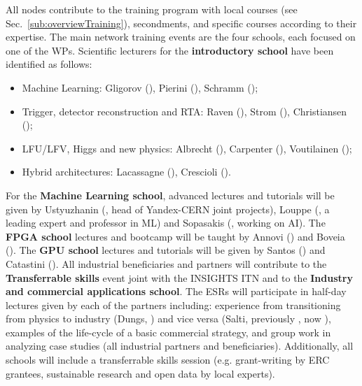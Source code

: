 All nodes contribute to the training program with local courses (see Sec.~\ref{sub:overviewTraining}), secondments, and specific courses according to their expertise. 
The main network training events are the four schools, each focused on one of the WPs. 
Scientific lecturers for the \textbf{introductory school} have been identified as follows:
\begin{itemize}
\item Machine Learning: Gligorov (\cnrsentity), Pierini (\cernentity), Schramm (\unigeentity);
\item Trigger, detector reconstruction and RTA: Raven (\nikhefentity), Strom (\oregonentity), Christiansen (\lundentity);
\item LFU/LFV, Higgs and new physics: Albrecht (\dortmundentity), Carpenter (\ohioentity), Voutilainen (\helsinkientity);
\item Hybrid architectures: Lacassagne (\sorbonneentity), Crescioli (\cnrsentity). 
\end{itemize}
For the \textbf{Machine Learning school}, advanced lectures and tutorials will be given by Ustyuzhanin (\yandex, head of Yandex-CERN joint projects), 
Louppe (\liegesentity, a leading expert and professor in ML) and Sopasakis (\ximantisentity, working on AI). 
The \textbf{FPGA school} lectures and bootcamp will be taught by Annovi (\pisaentity) and Boveia (\cernentity). 
The \textbf{GPU school} lectures and tutorials will be given by Santos (\santiagoentity) and Catastini (\lightboxentity). 
All industrial beneficiaries and partners will contribute to the \textbf{Transferrable skills} event joint with the INSIGHTS ITN and to the \textbf{Industry and commercial applications school}. 
The ESRs will participate in half-day lectures given by each of the partners including: experience from transitioning from physics to industry (Dungs, \pointeightentity) and vice versa (Salti, previously \fleetmaticsentity, now \uniboentity), examples of the life-cycle of a basic commercial strategy, and group work in analyzing case studies (all industrial partners and beneficiaries). 
Additionally, all schools will include a transferrable skills session (e.g. grant-writing by \acronym ERC grantees, sustainable research and open data by local experts).
%
